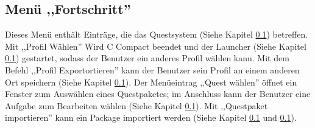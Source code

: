 \subsection{Menü ,,Fortschritt''}
Dieses Menü enthält Einträge, die das Questsystem (Siehe Kapitel \ref{}) betreffen. Mit ,,Profil Wählen'' Wird C Compact beendet und der Launcher (Siehe Kapitel \ref{}) gestartet, sodass der Benutzer ein anderes Profil wählen kann. Mit dem Befehl ,,Profil Exportortieren'' kann der Benutzer sein Profil an einem anderen Ort speichern (Siehe Kapitel \ref{}). Der Menüeintrag ,,Quest wählen'' öffnet ein Fenster zum Auswählen eines Questpaketes; im Anschluss kann der Benutzer eine Aufgabe zum Bearbeiten wählen (Siehe Kapitel \ref{}). Mit ,,Questpaket importieren'' kann ein Package importiert werden (Siehe Kapitel \ref{} und \ref{}).

